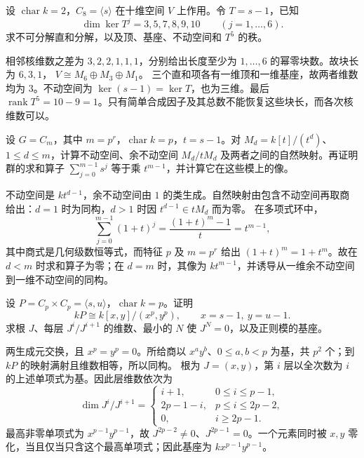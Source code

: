 \BookExercises

\begin{optionalexercise}\label{b5:ex:08-jordan-data}
	设 \(\operatorname{char}k=2\)，\(C_8=\langle s\rangle\) 在十维空间 \(V\) 上作用。令 \(T=s-1\)，已知
	\[
		\dim\ker T^j=3,5,7,8,9,10\qquad(j=1,\ldots,6).
	\]
	求不可分解直和分解，以及顶、基座、不动空间和 \(T^5\) 的秩。
\end{optionalexercise}
\begin{solution}
	相邻核维数之差为 \(3,2,2,1,1,1\)，分别给出长度至少为 \(1,\ldots,6\) 的幂零块数。故块长为 \(6,3,1\)， \(V\cong M_6\oplus M_3\oplus M_1\)。 三个直和项各有一维顶和一维基座，故两者维数均为 \(3\)。不动空间为 \(\ker(s-1)=\ker T\)，也为三维。最后 \(\operatorname{rank}T^5=10-9=1\)。只有简单合成因子及其总数不能恢复这些块长，而各次核维数可以。
\end{solution}

\begin{optionalexercise}\label{b5:ex:08-norm-invariants}
	设 \(G=C_m\)，其中 \(m=p^r\)，\(\operatorname{char}k=p\)，\(t=s-1\)。对 \(M_d=k[t]/(t^d)\)、\(1\leq d\leq m\)，计算不动空间、余不动空间 \(M_d/tM_d\) 及两者之间的自然映射。再证明群的求和算子 \(\sum_{j=0}^{m-1}s^j\) 等于乘 \(t^{m-1}\)，并计算它在这些模上的像。
\end{optionalexercise}
\begin{solution}
	不动空间是 \(kt^{d-1}\)，余不动空间由 \(1\) 的类生成。自然映射由包含不动空间再取商给出：\(d=1\) 时为同构，\(d>1\) 时因 \(t^{d-1}\in tM_d\) 而为零。 在多项式环中，
	\[
		\sum_{j=0}^{m-1}(1+t)^j =\frac{(1+t)^m-1}{t}=t^{m-1},
	\]
	其中商式是几何级数恒等式，而特征 \(p\) 及 \(m=p^r\) 给出 \((1+t)^m=1+t^m\)。故在 \(d<m\) 时求和算子为零；在 \(d=m\) 时，其像为 \(kt^{m-1}\)，并诱导从一维余不动空间到一维不动空间的同构。
\end{solution}

\begin{optionalexercise}\label{b5:ex:08-elementary-abelian-radical}
	设 \(P=C_p\times C_p=\langle s,u\rangle\)，\(\operatorname{char}k=p\)。证明
	\[
		kP\cong k[x,y]/(x^p,y^p),\qquad x=s-1,\ y=u-1.
	\]
	求根 \(J\)、每层 \(J^i/J^{i+1}\) 的维数、最小的 \(N\) 使 \(J^N=0\)，以及正则模的基座。
\end{optionalexercise}
\begin{solution}
	两生成元交换，且 \(x^p=y^p=0\)。所给商以 \(x^a y^b\)、\(0\leq a,b<p\) 为基，共 \(p^2\) 个；到 \(kP\) 的映射满射且维数相等，所以同构。 根为 \(J=(x,y)\)，第 \(i\) 层以全次数为 \(i\) 的上述单项式为基。因此层维数依次为
	\[
		\dim J^i/J^{i+1}=
		\begin{cases}
			i+1,&0\leq i\leq p-1,\\
			2p-1-i,&p\leq i\leq2p-2,\\
			0,&i\geq2p-1.
		\end{cases}
	\]
	最高非零单项式为 \(x^{p-1}y^{p-1}\)，故 \(J^{2p-2}\neq0\)、\(J^{2p-1}=0\)。一个元素同时被 \(x,y\) 零化，当且仅当只含这个最高单项式；因此基座为 \(kx^{p-1}y^{p-1}\)。
\end{solution}


